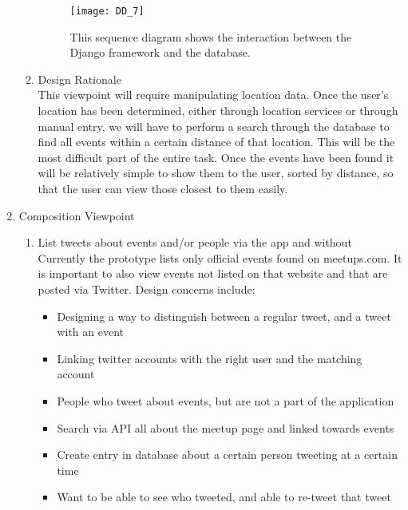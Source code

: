 \documentclass[draftclsnofoot,10pt,onecolumn]{IEEEtran} %
\begin{document}
\begin{enumerate}
\begin{enumerate}
				\begin{figure}[H]
  					\begin{center}
						\texttt{[image: DD\_7]}
						\captionsetup{width=.4\linewidth}
						\centering
  						\caption{This sequence diagram shows the interaction between the Django framework and the database.}
  					\end{center}
				\end{figure}
					
				\item Design Rationale \\
				This viewpoint will require manipulating location data. Once the user's location has been determined, either
				through location services or through manual entry, we will have to perform a search through the database to
				find all events within a certain distance of that location. This will be the most difficult part of the entire
				task. Once the events have been found it will be relatively simple to show them to the user, sorted by
				distance, so that the user can view those closest to them easily. \\
			\end{enumerate}
			
		\item Composition Viewpoint \\
			\begin{enumerate}
				\item List tweets about events and/or people via the app and without \\
				Currently the prototype lists only official events found on meetups.com. It is important to also view events
				not listed on that website and that are posted via Twitter. Design concerns include:
				\begin{itemize}
					\item Designing a way to distinguish between a regular tweet, and a tweet with an event
					\item Linking twitter accounts with the right user and the matching account
					\item People who tweet about events, but are not a part of the application
					\item Search via API all about the meetup page and linked towards events
					\item Create entry in database about a certain person tweeting at a certain time
					\item Want to be able to see who tweeted, and able to re-tweet that tweet \\
				\end{itemize}
				

\end{enumerate}
\end{enumerate}
\end{document}

